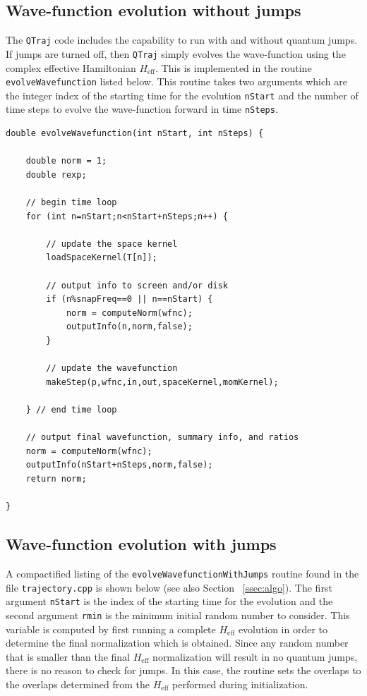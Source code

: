 \documentclass[times,sort&compress,final]{elsarticle}
\def\qtraj{{\tt QTraj} }
\begin{document}
\subsection{Wave-function evolution without jumps}

The \qtraj code includes the capability to run with and without quantum jumps.  If jumps are turned off, then \qtraj simply evolves the wave-function using the complex effective Hamiltonian $H_\text{eff}$.  This is implemented in the routine {\tt evolveWavefunction} listed below.  This routine takes two arguments which are the integer index of the starting time for the evolution {\tt nStart} and the number of time steps to evolve the wave-function forward in time {\tt nSteps}.
%
\begin{lstlisting}
double evolveWavefunction(int nStart, int nSteps) {
    
    double norm = 1;
    double rexp;
    
    // begin time loop
    for (int n=nStart;n<nStart+nSteps;n++) {
        
        // update the space kernel
        loadSpaceKernel(T[n]);
        
        // output info to screen and/or disk
        if (n%snapFreq==0 || n==nStart) {
            norm = computeNorm(wfnc);
            outputInfo(n,norm,false);
        }
        
        // update the wavefunction
        makeStep(p,wfnc,in,out,spaceKernel,momKernel);
    
    } // end time loop
    
    // output final wavefunction, summary info, and ratios
    norm = computeNorm(wfnc);
    outputInfo(nStart+nSteps,norm,false);
    return norm;
    
}
\end{lstlisting}

\subsection{Wave-function evolution with jumps}

A compactified listing of the {\tt evolveWavefunctionWithJumps} routine found in the file {\tt trajectory.cpp} is shown below (see also Section ~\ref{ssec:algo}).  
The first argument {\tt nStart} is the index of the starting time for the evolution and the second argument {\tt rmin} is the minimum initial random number to consider.  
This variable is computed by first running a complete $H_\text{eff}$ evolution in order to determine the final normalization which is obtained.
Since any random number that is smaller than the final $H_\text{eff}$ normalization will result in no quantum jumps, there is no reason to check for jumps.  
In this case, the routine sets the overlaps to the overlaps determined from the $H_\text{eff}$ performed during initialization.
\end{document}
